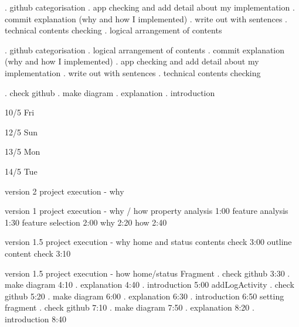 \1. github categorisation
\2. app checking and add detail about my implementation
\3. commit explanation (why and how I implemented)
\4. write out with sentences
\5. technical contents checking 
\6. logical arrangement of contents

\1. github categorisation
\2. logical arrangement of contents
\3. commit explanation (why and how I implemented)
\4. app checking and add detail about my implementation
\5. write out with sentences
\6. technical contents checking 

\1. check github 
\2. make diagram
\3. explanation
\4. introduction

10/5 Fri

12/5 Sun 


13/5 Mon
    




14/5 Tue

version 2 project execution - why 

version 1 project execution - why / how
    property analysis 1:00
    feature analysis 1:30
    feature selection 2:00
    why 2:20
    how 2:40

version 1.5 project execution - why 
    home and status contents check 3:00
    outline content check 3:10
    
version 1.5 project execution - how
    home/status Fragment
        \1. check github 3:30
        \2. make diagram 4:10
        \3. explanation 4:40
        \4. introduction 5:00
    addLogActivity
        \1. check github 5:20
        \2. make diagram 6:00
        \3. explanation 6:30
        \4. introduction 6:50
    setting fragment
        \1. check github 7:10
        \2. make diagram 7:50
        \3. explanation 8:20
        \4. introduction 8:40

